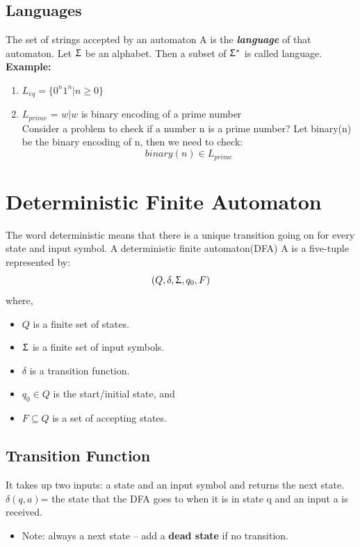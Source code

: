 \documentclass{report}
\begin{document}
    \subsection{Languages}
    The set of strings accepted by an automaton A is the \textbf{\textit{language}} of that automaton.
    Let $\Upsigma$ be an alphabet. Then a subset of $\Upsigma^*$ is called language. \textbf{Example:}
    \begin{enumerate}
        \item $L_{eq} = \{0^n1^n|n\geqslant0\}$
        \item $L_{prime}$ = {$w|w$ is binary encoding of a prime number}\\
              Consider a problem to check if a number n is a prime number?
              Let binary(n) be the binary encoding of n, then we need to check:
            $$binary(n) \in L_{prime}$$
    \end{enumerate}
    
\section{Deterministic Finite Automaton}
    The word deterministic means that there is a unique transition going on for every state and input symbol. A deterministic finite automaton(DFA) A is a five-tuple represented by:
    $$(Q,\delta,\Upsigma,q_0,F)$$
    where, \begin{itemize}
        \item $Q$ is a finite set of states.
        \item $\Upsigma$ is a finite set of input symbols.
        \item $\delta$ is a transition function.
        \item $q_0 \in Q$ is the start/initial state, and
        \item $F \subseteq Q$ is a set of accepting states.
    \end{itemize}
    \subsection{Transition Function}
    It takes up two inputs: a state and an input symbol and returns the next state.
    $\delta(q,a)$= the state that the DFA goes to when it is in state q and an input a is received.
    \begin{itemize}
        \item Note: always a next state – add a \textbf{dead state} if no transition.
    \end{itemize}
\end{document}

